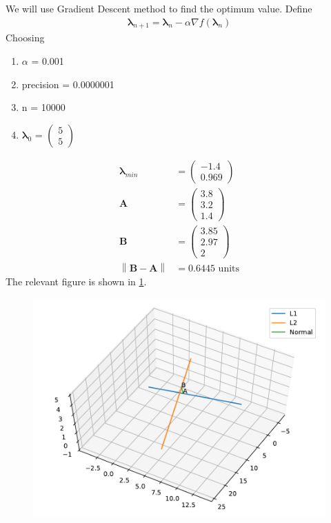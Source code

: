 \documentclass[12pt]{article}
\providecommand{\brak}[1]{\ensuremath{\left(#1\right)}}
\providecommand{\norm}[1]{\left\lVert#1\right\rVert}
\newcommand{\myvec}[1]{\ensuremath{\begin{pmatrix}#1\end{pmatrix}}}
\let\vec\mathbf
\begin{document}
\begin{enumerate}
We will use Gradient Descent method to find the optimum value. Define
\begin{align}
	\label{eq:grad_des}
	\bm{\lambda}_{n+1} = \bm{\lambda}_n - \alpha \nabla f\brak{\vec{\bm{\lambda}}_n}
\end{align}
Choosing
\begin{enumerate}
\item $\alpha$ = 0.001
\item precision = 0.0000001
\item n = 10000
\item $\bm{\lambda}_0$ = $\myvec{5 \\ 5}$ 
\end{enumerate}
\begin{align}
	\bm{\lambda}_{min} &= \myvec{-1.4\\ 0.969} \\
	\vec{A} &= \myvec{3.8\\3.2\\ 1.4}\\
	\vec{B} &= \myvec{3.85\\2.97\\ 2}\\
	\norm{\vec{B}-\vec{A}} &= 0.6445 \text{ units}
\end{align}
The relevant figure is shown in \ref{fig:Fig1}. 
\begin{figure}[!h]
	\begin{center}
		\includegraphics[width=\columnwidth]{figs/problem30.pdf}
	\end{center}
\caption{}
\label{fig:Fig1}
\end{figure}
\end{enumerate}
\end{document}
